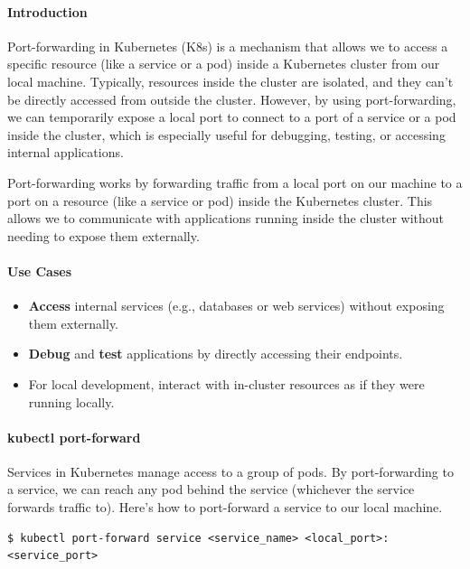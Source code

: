 \documentclass{article}
\newenvironment{codetemplate}[1][]{%
  \mybasecolorbox[#1]
  \itshape
}{%
  \endmybasecolorbox
}
\begin{document}
\paragraph{Introduction}
Port-forwarding in Kubernetes (K8s) is a mechanism that allows we to access a specific resource (like a service or a pod) inside a Kubernetes cluster from our local machine. Typically, resources inside the cluster are isolated, and they can't be directly accessed from outside the cluster. However, by using port-forwarding, we can temporarily expose a local port to connect to a port of a service or a pod inside the cluster, which is especially useful for debugging, testing, or accessing internal applications.

Port-forwarding works by forwarding traffic from a local port on our machine to a port on a resource (like a service or pod) inside the Kubernetes cluster. This allows we to communicate with applications running inside the cluster without needing to expose them externally.

\paragraph{Use Cases}
\begin{itemize}
    \item \textbf{Access} internal services (e.g., databases or web services) without exposing them externally.
    \item \textbf{Debug} and \textbf{test} applications by directly accessing their endpoints.
    \item For local development, interact with in-cluster resources as if they were running locally.
\end{itemize}

\paragraph{kubectl port-forward}
Services in Kubernetes manage access to a group of pods. By port-forwarding to a service, we can reach any pod behind the service (whichever the service forwards traffic to). Here's how to port-forward a service to our local machine.

\begin{codetemplate}{}
\begin{verbatim}
$ kubectl port-forward service <service_name> <local_port>:<service_port>
\end{verbatim}
\end{codetemplate}
\end{document}
